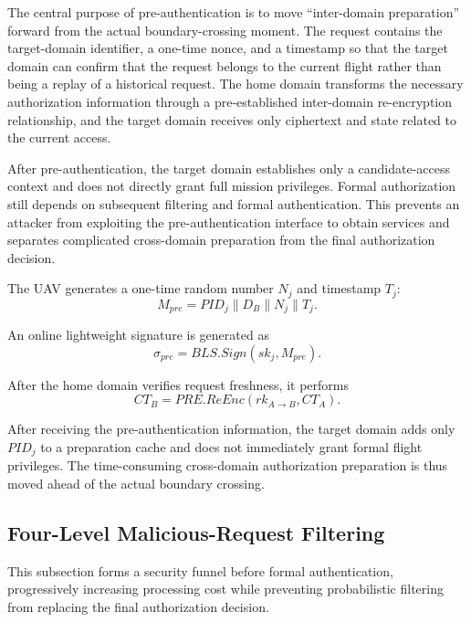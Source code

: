 \documentclass[lettersize,journal]{IEEEtran}
\begin{document}
	
	The central purpose of pre-authentication is to move ``inter-domain preparation'' forward from the actual boundary-crossing moment. The request contains the target-domain identifier, a one-time nonce, and a timestamp so that the target domain can confirm that the request belongs to the current flight rather than being a replay of a historical request. The home domain transforms the necessary authorization information through a pre-established inter-domain re-encryption relationship, and the target domain receives only ciphertext and state related to the current access.
	
	After pre-authentication, the target domain establishes only a candidate-access context and does not directly grant full mission privileges. Formal authorization still depends on subsequent filtering and formal authentication. This prevents an attacker from exploiting the pre-authentication interface to obtain services and separates complicated cross-domain preparation from the final authorization decision.
	
	The UAV generates a one-time random number $N_j$ and timestamp $T_j$:
	\begin{equation}
		M_{pre}=PID_j\parallel D_B\parallel N_j\parallel T_j.
	\end{equation}
	
	An online lightweight signature is generated as
	\begin{equation}
		\sigma_{pre}=BLS.Sign(sk_j,M_{pre}).
	\end{equation}
	
	After the home domain verifies request freshness, it performs
	\begin{equation}
		CT_B=PRE.ReEnc(rk_{A\rightarrow B},CT_A).
	\end{equation}
	
	After receiving the pre-authentication information, the target domain adds only $PID_j$ to a preparation cache and does not immediately grant formal flight privileges. The time-consuming cross-domain authorization preparation is thus moved ahead of the actual boundary crossing.
	
	\subsection{Four-Level Malicious-Request Filtering}
	This subsection forms a security funnel before formal authentication, progressively increasing processing cost while preventing probabilistic filtering from replacing the final authorization decision.
	
\end{document}

